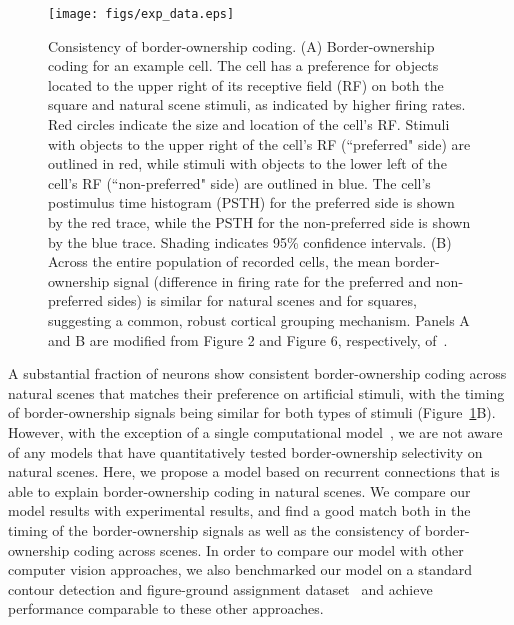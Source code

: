 \documentclass[12pt]{article}
\begin{document}
\begin{figure}%
\hfill
\begin{center}
\texttt{[image: figs/exp\_data.eps]}
\end{center}
\caption{Consistency of border-ownership coding. (A) Border-ownership coding for an example cell. The cell has a preference for objects located to the upper right of its receptive field (RF) on both the square and natural scene stimuli, as indicated by higher firing rates. Red circles indicate the size and location of the cell's RF. Stimuli with objects to the upper right of the cell's RF (``preferred" side) are outlined in red, while stimuli with objects to the lower left of the cell's RF (``non-preferred" side) are outlined in blue. The cell's postimulus time histogram (PSTH) for the preferred side is shown by the red trace, while the PSTH for the non-preferred side is shown by the blue trace. Shading indicates 95\% confidence intervals.
%
%
 (B) Across the entire population of recorded cells, the mean border-ownership signal (difference in firing rate for the preferred and non-preferred sides) is similar for natural scenes and for squares, suggesting a common, robust cortical grouping mechanism.
 Panels A and B are modified from Figure 2 and Figure 6, respectively, of~\citet{Williford_vonderHeydt16}. }
\label{Fig:experiments}
\end{figure}

A substantial fraction of neurons show consistent border-ownership coding across natural scenes that matches their preference on artificial stimuli, with the timing of border-ownership signals being similar for both types of stimuli (Figure~\ref{Fig:experiments}B). However, with the exception of a single computational model~\citep{Sakai_etal12}, we are not aware of any models that have quantitatively tested border-ownership selectivity on natural scenes. Here, we propose a model based on recurrent connections that is able to explain border-ownership coding in natural scenes. We compare our model results with experimental results, and find a good match both in the timing of the border-ownership signals as well as the consistency of border-ownership coding across scenes.
%
%
In order to compare our model with other computer vision approaches, we also benchmarked our model on a standard contour detection and figure-ground assignment dataset~\citep{Martin_etal01} and achieve performance comparable to these other approaches.
\end{document}

